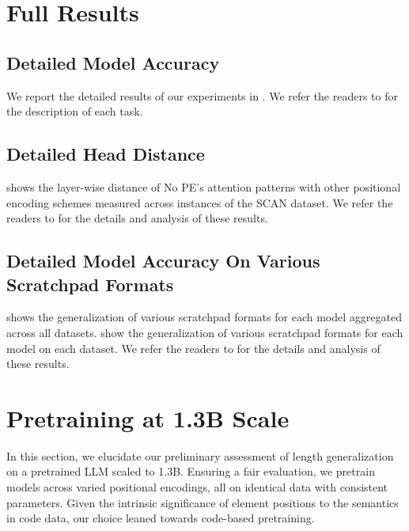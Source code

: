 \documentclass{article}
\begin{document}
\section{Full Results}
\label{sec:full-results}

\subsection{Detailed Model Accuracy}
We report the detailed results of our experiments in . We refer the readers to  for the description of each task. 

\subsection{Detailed Head Distance}
\label{sec:full_head_distance}


 shows the layer-wise distance of No PE's attention patterns with other positional encoding schemes measured across instances of the SCAN dataset. We refer the readers to  for the details and analysis of these results.

\subsection{Detailed Model Accuracy On Various Scratchpad Formats}


 shows the generalization of various scratchpad formats for each model aggregated across all datasets. 
 show the generalization of various scratchpad formats for each model on each dataset.
We refer the readers to  for the details and analysis of these results.

\section{Pretraining at 1.3B Scale}
\label{sec:scaling_experiments}

In this section, we elucidate our preliminary assessment of length generalization on a pretrained LLM scaled to 1.3B. Ensuring a fair evaluation, we pretrain models across varied positional encodings, all on identical data with consistent parameters. Given the intrinsic significance of element positions to the semantics in code data, our choice leaned towards code-based pretraining. 
\end{document}
